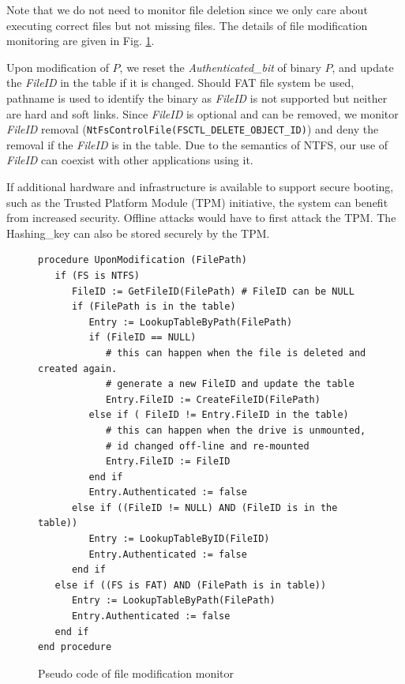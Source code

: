 \noindent
Note that we do not need to monitor file deletion since we only care about
executing correct files but not missing files.
The details of file modification monitoring are given in Fig. \ref{fileopen}.

Upon modification of $P$, we reset the {\it Authenticated\_bit} of binary $P$, 
and update the {\it FileID} in the table if it is changed.
Should FAT file system be used, pathname is used 
to identify the binary as {\it FileID} is not supported but
neither are hard and soft links.
Since {\it FileID} is optional and can be removed,
we monitor {\it FileID} removal ({\tt NtFsControlFile(FSCTL\_DELETE\_OBJECT\_ID)})
and deny the removal if the {\it FileID} is in the table.
Due to the semantics of NTFS, our use of {\it FileID} can
coexist with other applications using it.

If additional hardware and infrastructure is available to support
secure booting, such as the Trusted Platform Module (TPM) initiative,
the system can benefit from increased security.
Offline attacks would have to first attack the TPM.
The Hashing\_key can also be stored securely by the TPM.


\begin{figure}[tb]
\scriptsize
\begin{center}
\begin{verbatim}
procedure UponModification (FilePath)
   if (FS is NTFS)
      FileID := GetFileID(FilePath) # FileID can be NULL
      if (FilePath is in the table)
         Entry := LookupTableByPath(FilePath)
         if (FileID == NULL)
            # this can happen when the file is deleted and created again.
            # generate a new FileID and update the table
            Entry.FileID := CreateFileID(FilePath)
         else if ( FileID != Entry.FileID in the table)
            # this can happen when the drive is unmounted,
            # id changed off-line and re-mounted
            Entry.FileID := FileID
         end if
         Entry.Authenticated := false
      else if ((FileID != NULL) AND (FileID is in the table))
         Entry := LookupTableByID(FileID)
         Entry.Authenticated := false
      end if
   else if ((FS is FAT) AND (FilePath is in table))
      Entry := LookupTableByPath(FilePath)
      Entry.Authenticated := false
   end if
end procedure
\end{verbatim}
\end{center}
\caption{Pseudo code of file modification monitor
}
\label{fileopen}
\end{figure}
